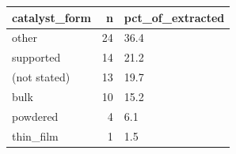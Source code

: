 \begin{tabular}{lrl}
\toprule
catalyst\_form & n & pct\_of\_extracted \\
\midrule
other & 24 & 36.4 \\
supported & 14 & 21.2 \\
(not stated) & 13 & 19.7 \\
bulk & 10 & 15.2 \\
powdered & 4 & 6.1 \\
thin\_film & 1 & 1.5 \\
\bottomrule
\end{tabular}
